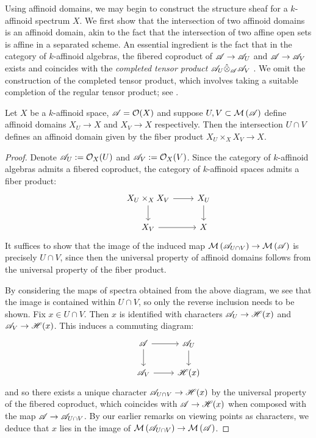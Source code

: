 Using affinoid domains, we may begin to construct the structure sheaf for a $k$-affinoid spectrum $X$. We first show that the intersection of two affinoid domains is an affinoid domain, akin to the fact that the intersection of two affine open sets is affine in a separated scheme.
An essential ingredient is the fact that in the category of $k$-affinoid algebras, the fibered coproduct of $\mathscr{A} \to \mathscr{A}_U$ and $\mathscr{A} \to \mathscr{A}_V$ exists and coincides with the \textit{completed tensor product} $\mathscr{A}_U \hat{\otimes}_{\mathscr{A}} \mathscr{A}_V$ \parencite[\S 3.1.4.1]{temk}.
We omit the construction of the completed tensor product, which involves taking a suitable completion of the regular tensor product; see \parencite[Definition 2.1.2.3]{temk}.

\begin{prop} \label{intersectaffinoids} \parencite[\S 2.2.2]{berk1}
    Let $X$ be a $k$-affinoid space, $\mathscr{A} = \mathcal{O}(X)$ and suppose $U, V \subset \mathcal{M}\left(\mathscr{A}\right)$ define affinoid domains $X_U \to X$ and $X_V \to X$ respectively.
    Then the intersection $U \cap V$ defines an affinoid domain given by the fiber product $X_U \times_{X} X_V \to X$.
\end{prop}
\begin{proof}
    Denote $\mathscr{A}_U := \mathcal{O}_X(U)$ and $\mathscr{A}_V := \mathcal{O}_X(V)$.
    Since the category of $k$-affinoid algebras admits a fibered coproduct, the category of $k$-affinoid spaces admits a fiber product:
    \[
\begin{tikzcd}
& X_U \times_{X} X_V \arrow[r] \arrow[d] & X_U \arrow[d] \\
 & X_V \arrow[r] & X
\end{tikzcd}
\]
    It suffices to show that the image of the induced map $\mathcal{M}\left(\mathscr{A}_{U \cap V}\right) \to \mathcal{M}\left(\mathscr{A}\right)$ is precisely $U \cap V$, since then the universal property of affinoid domains follows from the universal property of the fiber product.
    
    By considering the maps of spectra obtained from the above diagram, we see that the image is contained within $U \cap V$, so only the reverse inclusion needs to be shown. Fix $x \in U \cap V$. Then $x$ is identified with characters $\mathscr{A}_U \to \mathscr{H}(x)$ and $\mathscr{A}_V \to \mathscr{H}(x)$. This induces a commuting diagram:
    \[
\begin{tikzcd}
& \banr \arrow[r] \arrow[d] & \banr_U \arrow[d] \\
 & \banr_V \arrow[r] & \resfield
\end{tikzcd}
\]
    and so there exists a unique character $\mathscr{A}_{U \cap V} \to \mathscr{H}(x)$ by the universal property of the fibered coproduct, which coincides with $\mathscr{A} \to \mathscr{H}(x)$ when composed with the map $\mathscr{A} \to \mathscr{A}_{U \cap V}$.
    By our earlier remarks on viewing points as characters, we deduce that $x$ lies in the image of $\mathcal{M}\left(\mathscr{A}_{U \cap V}\right) \to \mathcal{M}\left(\mathscr{A}\right)$.
\end{proof}

